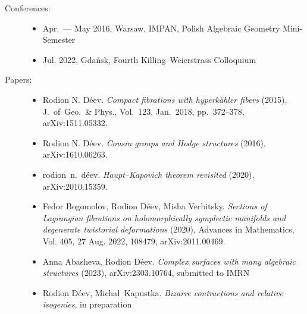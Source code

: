 \documentclass{article}
\begin{document}
\begin{description}

\item[Conferences:] \begin{itemize}
\item Apr.~--- May 2016,  Warsaw,  IMPAN,  Polish Algebraic Geometry Mini-Semester
\item Jul.  2022,  Gda\'nsk,  Fourth Killing--Weierstrass Colloquium
\end{itemize}


\item[Papers:] \begin{itemize}
     \item Rodion N. D\'eev. {\em 
     Compact fibrations with hyperk\"ahler fibers} (2015), J.~of~Geo.~\& Phys., 
     Vol.~123, Jan.~2018, pp.~372--378, arXiv:1511.05332.
     \item Rodion N. D\'eev. {\em
     Cousin groups and Hodge structures} (2016), arXiv:1610.06263.
     \item rodion~n.~d\'eev. {\em Haupt--Kapovich theorem revisited} (2020),
     arXiv:2010.15359.
     \item Fedor Bogomolov, Rodion D\'eev, Misha Verbitsky. {\em 
     Sections of Lagrangian fibrations on holomorphically symplectic manifolds 
     and degenerate twistorial deformations} (2020),  Advances in Mathematics, 
     Vol.  405,  27 Aug.  2022,  108479,  arXiv:2011.00469.
     \item Anna Abasheva,  Rodion D\'eev.  {\em Complex surfaces with many 
     algebraic  structures} (2023),  arXiv:2303.10764,  submitted to IMRN
     \item Rodion D\'eev,  Micha\l~Kapustka.  {\em Bizarre contractions and 
     relative isogenies},  in preparation
\end{itemize}


\end{description}
\end{document}

